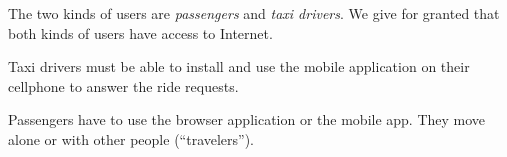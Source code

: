 The two kinds of users are \emph{passengers} and \emph{taxi drivers}.
We give for granted that both kinds of users have access to Internet.

Taxi drivers must be able to install and use the mobile application on their cellphone to answer the ride requests.

Passengers have to use the browser application or the mobile app. They move alone or with other people (``travelers'').
